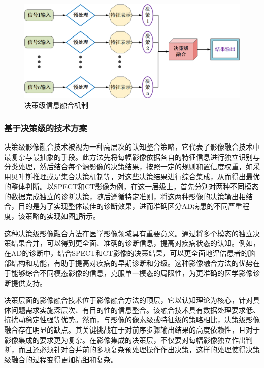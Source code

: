    \begin{figure}[htbp]
      \centering  
      \includegraphics[width=0.9\linewidth]{figs/decisionFusion.png}
      \caption{决策级信息融合机制}\label{decisionFusion}
    \end{figure}
\subsubsection{基于决策级的技术方案}
决策级影像融合技术被视为一种高层次的认知整合策略，它代表了影像融合技术中最复杂与最抽象的手段。此方法先将每幅影像依据各自的特征信息进行独立识别与分类处理，然后结合每个源影像的决策结果，按照一定的规则和置信度权重，如采用贝叶斯推理或是集合决策机制等，对这些决策结果进行综合集成，从而得出最优的整体判断。以SPECT和CT影像为例，在这一层级上，首先分别对两种不同模态的数据完成独立的诊断决策，随后遵循特定准则，将这两种影像的决策输出相结合，目的是为了实现整体最佳的诊断效果，进而准确区分AD病患的不同严重程度，该策略的实现如图\ref{decisionFusion}所示。

这种决策级影像融合方法在医学影像领域具有重要意义。通过将多个模态的独立决策结果合并，可以得到更全面、准确的诊断信息，提高对疾病状态的认知。例如，在AD的诊断中，结合SPECT和CT影像的决策结果，可以更全面地评估患者的脑部结构和功能，有助于提高对疾病的早期诊断和分级。这种影像融合方法的优势在于能够综合不同模态影像的信息，克服单一模态的局限性，为更准确的医学影像诊断提供支持。


决策层面的影像融合技术位于影像融合方法的顶层，它以认知理论为核心，针对具体问题需求实施深层次、有目的性的信息整合。该融合技术具有数据处理要求低、抗扰动稳定性强等优势。然而，与影像的像素级或特征级的策略相比，决策级影像融合存在明显的缺点。其关键挑战在于对前序步骤输出结果的高度依赖性，且对于影像集成的要求更为复杂。在影像集成的决策层，不仅要对每幅影像独立作出判断，而且还必须针对合并前的多项复杂预处理操作作出决策，这样的处理使得决策级融合的过程变得更加精细和复杂。


